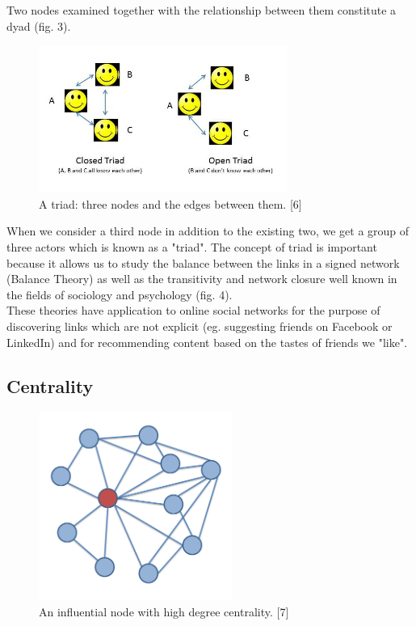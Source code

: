 \documentclass[conference,letterpaper]{IEEEtran}
\begin{document}
Two nodes examined together with the relationship between them constitute a dyad (fig. 3). \\

\begin{center}
\begin{figure}[hb]
\centering
\includegraphics[width=3.2in]{open-triad}
\caption{
A triad: three nodes and the edges between them. [6]
}
\label{fig_sim}
\end{figure}
\end{center}

When we consider a third node in addition to the existing two, we get a group of three actors which is known as a "triad". The concept of triad is important because it allows us to study the balance between the links in a signed network (Balance Theory) as well as the transitivity and network closure well known in the fields of sociology and psychology (fig. 4).\\
These theories have application to online social networks for the purpose of discovering links which are not explicit (eg. suggesting friends on Facebook or LinkedIn) and for recommending content based on the tastes of friends we "like".\\

\subsection{Centrality}

\begin{center}
\begin{figure}[hb]
\centering
\includegraphics[width=2.5in]{ego_network}
\caption{
An influential node with high degree centrality. [7]
}
\label{fig_sim}
\end{figure}
\end{center}
\end{document}
